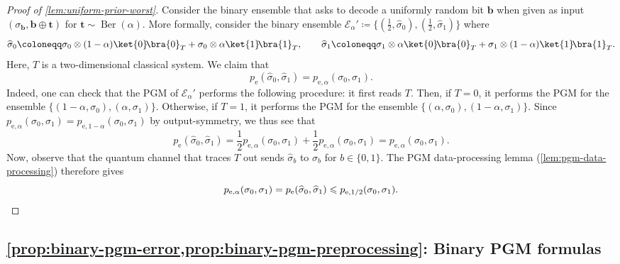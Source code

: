 \documentclass[11pt]{article}
\renewcommand{\leq}{\leqslant}
\theoremstyle{remark}
\newcommand{\ketbra}[2]{\ket{#1}\!\bra{#2}}
\newcommand{\cE}{\mathcal{E}}
\newcommand{\Ber}{\operatorname{Ber}}
\newcommand{\bits}{\{0,1\}}
\newcommand{\bb}{\mathbf{b}}
\begin{document}
\begin{proof}[Proof of \cref{lem:uniform-prior-worst}]
Consider the binary ensemble that asks to decode a uniformly random bit $\bb$ when given as input $(\sigma_\bb,\bb \oplus \mathbf{t})$ for $\mathbf{t} \sim \Ber(\alpha)$. More formally, consider the binary ensemble $\cE_\alpha' \coloneqq \{(\frac{1}{2}, \widehat{\sigma}_0), (\frac{1}{2}, \widehat{\sigma}_1)\}$ where
\begin{equation*}
\widehat{\sigma}_0
\coloneqq \sigma_0 \otimes (1-\alpha)\ketbra{0}{0}_T + \sigma_0 \otimes \alpha\ketbra{1}{1}_T,
\qquad
\widehat{\sigma}_1
\coloneqq \sigma_1 \otimes \alpha\ketbra{0}{0}_T + \sigma_1 \otimes (1-\alpha)\ketbra{1}{1}_T.
\end{equation*}
Here, $T$ is a two-dimensional classical system. We claim that
\begin{equation*}
p_{\mathrm{e}}(\widehat{\sigma}_0,\widehat{\sigma}_1) = p_{\mathrm{e},\alpha}(\sigma_0,\sigma_1).
\end{equation*}
Indeed, one can check that the PGM of $\cE_\alpha'$ performs the following procedure: it first reads $T$. Then, if $T = 0$, it performs the PGM for the ensemble $\{(1-\alpha,\sigma_0),(\alpha,\sigma_1)\}$. Otherwise, if $T = 1$, it performs the PGM for the ensemble $\{(\alpha,\sigma_0),(1-\alpha,\sigma_1)\}$. Since $p_{\mathrm{e},\alpha}(\sigma_0,\sigma_1) = p_{\mathrm{e},1-\alpha}(\sigma_0,\sigma_1)$ by output-symmetry, we thus see that
\begin{equation*}
p_{\mathrm{e}}(\widehat{\sigma}_0,\widehat{\sigma}_1)
= \frac{1}{2}p_{\mathrm{e},\alpha}(\sigma_0,\sigma_1) + \frac{1}{2}p_{\mathrm{e},\alpha}(\sigma_0,\sigma_1)
= p_{\mathrm{e},\alpha}(\sigma_0,\sigma_1).
\end{equation*}
Now, observe that the quantum channel that traces $T$ out sends $\widehat{\sigma}_b$ to $\sigma_b$ for $b \in \bits$. The PGM data-processing lemma (\cref{lem:pgm-data-processing}) therefore gives
\begin{equation*}
p_{\mathrm{e},\alpha}(\sigma_0,\sigma_1) = p_{\mathrm{e}}(\widehat{\sigma}_0,\widehat{\sigma}_1) \leq p_{\mathrm{e},1/2}(\sigma_0,\sigma_1).\qedhere
\end{equation*}
\end{proof}

\subsection{\texorpdfstring{\cref{prop:binary-pgm-error,prop:binary-pgm-preprocessing}}{Propositions  and }: Binary PGM formulas}
\label{appsubsec:proof-binary-pgm-formulas}
\end{document}
